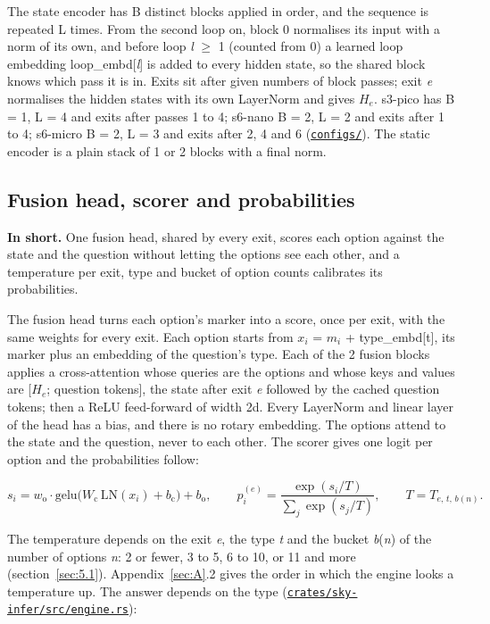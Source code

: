 \documentclass[10pt]{article}
\begin{document}
The state encoder has B distinct blocks applied in order, and the sequence is repeated L times. From the second loop on, block 0 normalises its input with a norm of its own, and before loop \emph{l} $\geq$ 1 (counted from 0) a learned loop embedding loop\_embd[\emph{l}] is added to every hidden state, so the shared block knows which pass it is in. Exits sit after given numbers of block passes; exit \emph{e} normalises the hidden states with its own LayerNorm and gives $H_{e}$. s3-pico has B = 1, L = 4 and exits after passes 1 to 4; s6-nano B = 2, L = 2 and exits after 1 to 4; s6-micro B = 2, L = 3 and exits after 2, 4 and 6 (\href{https://github.com/maxgfr/skycmd/tree/main/configs}{\texttt{configs/\allowbreak{}}}). The static encoder is a plain stack of 1 or 2 blocks with a final norm.

\subsection{Fusion head, scorer and probabilities}\label{sec:3.5}

\textbf{In short.} One fusion head, shared by every exit, scores each option against the state and the question without letting the options see each other, and a temperature per exit, type and bucket of option counts calibrates its probabilities.

The fusion head turns each option's marker into a score, once per exit, with the same weights for every exit. Each option starts from $x_{i}$ = $m_{i}$ + type\_embd[t], its marker plus an embedding of the question's type. Each of the 2 fusion blocks applies a cross-attention whose queries are the options and whose keys and values are [$H_{e}$; question tokens], the state after exit \emph{e} followed by the cached question tokens; then a ReLU feed-forward of width 2d. Every LayerNorm and linear layer of the head has a bias, and there is no rotary embedding. The options attend to the state and the question, never to each other. The scorer gives one logit per option and the probabilities follow:

\begin{equation}\label{eq:2}
s_i = w_{\mathrm{o}} \cdot \mathrm{gelu}\bigl(W_{\mathrm{c}}\, \mathrm{LN}(x_i) + b_{\mathrm{c}}\bigr) + b_{\mathrm{o}}, \qquad
p^{(e)}_i = \frac{\exp(s_i / T)}{\sum_j \exp(s_j / T)}, \qquad T = T_{e,\,t,\,b(n)}.
\end{equation}

The temperature depends on the exit \emph{e}, the type \emph{t} and the bucket \emph{b}(\emph{n}) of the number of options \emph{n}: 2 or fewer, 3 to 5, 6 to 10, or 11 and more (section~\ref{sec:5.1}). Appendix~\ref{sec:A}.2 gives the order in which the engine looks a temperature up. The answer depends on the type (\href{https://github.com/maxgfr/skycmd/blob/main/crates/sky-infer/src/engine.rs}{\texttt{crates/\allowbreak{}sky-infer/\allowbreak{}src/\allowbreak{}engine.rs}}):
\end{document}
